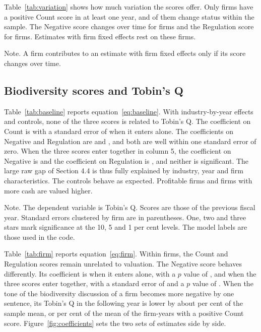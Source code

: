 \documentclass[12pt,a4paper]{article}
\newcommand{\tablenote}[1]{\par\smallskip\begin{minipage}{\linewidth}\footnotesize\setstretch{1.05}#1\end{minipage}}
\newcommand{\widetable}[1]{\resizebox{\ifdim\width>\linewidth\linewidth\else\width\fi}{!}{}}
\begin{document}
Table~\ref{tab:variation} shows how much variation the scores offer. Only \nEverCount{} firms have a positive Count score in at least one year, and \nChangeCount{} of them change status within the sample. The Negative score changes over time for \nChangeNeg{} firms and the Regulation score for \nChangeReg{} firms. Estimates with firm fixed effects rest on these firms.

\begin{table}[!htbp]
\centering\small
\caption{Variation in the scores within the sample}\label{tab:variation}
\widetable{tables/tab_variation}
\tablenote{Note. A firm contributes to an estimate with firm fixed effects only if its score changes over time.}
\end{table}

\subsection{Biodiversity scores and Tobin's Q}

Table~\ref{tab:baseline} reports equation~\eqref{eq:baseline}. With industry-by-year effects and controls, none of the three scores is related to Tobin's Q. The coefficient on Count is \coefBCount{} with a standard error of \seBCount{} when it enters alone. The coefficients on Negative and Regulation are \coefBNeg{} and \coefBReg{}, and both are well within one standard error of zero. When the three scores enter together in column 5, the coefficient on Negative is \coefBAllNeg{} and the coefficient on Regulation is \coefBAllReg{}, and neither is significant. The large raw gap of Section 4.4 is thus fully explained by industry, year and firm characteristics. The controls behave as expected. Profitable firms and firms with more cash are valued higher.

\begin{table}[!htbp]
\centering\small
\caption{Biodiversity scores and Tobin's Q with industry-by-year effects}\label{tab:baseline}
\widetable{tables/tab_baseline}
\tablenote{Note. The dependent variable is Tobin's Q. Scores are those of the previous fiscal year. Standard errors clustered by firm are in parentheses. One, two and three stars mark significance at the 10, 5 and 1 per cent levels. The model labels are those used in the code.}
\end{table}

Table~\ref{tab:firm} reports equation~\eqref{eq:firm}. Within firms, the Count and Regulation scores remain unrelated to valuation. The Negative score behaves differently. Its coefficient is \coefFNeg{} when it enters alone, with a $p$ value of \pvalFNeg{}, and \coefFAllNeg{} when the three scores enter together, with a standard error of \seFAllNeg{} and a $p$ value of \pvalFAllNeg{}. When the tone of the biodiversity discussion of a firm becomes more negative by one sentence, its Tobin's Q in the following year is lower by about \effNegMean{} per cent of the sample mean, or \effNegDisc{} per cent of the mean of the firm-years with a positive Count score. Figure~\ref{fig:coefficients} sets the two sets of estimates side by side.
\end{document}
